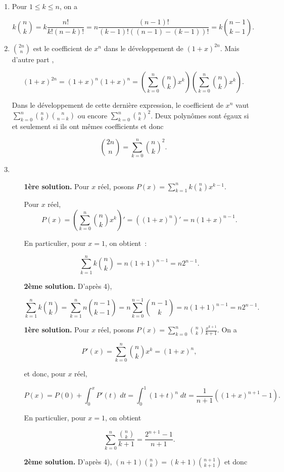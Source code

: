 \documentclass[11pt,a4paper]{article}
\begin{document}
\begin{enumerate}
\item  Pour $1\leq k\leq n$, on a

$$k\binom{n}{k}=k\frac{n!}{k!(n-k)!}=n\frac{(n-1)!}{(k-1)!((n-1)-(k-1))!}=k\binom{n-1}{k-1}.$$

\item  $\binom{2n}{n}$ est le coefficient de $x^n$ dans le développement de $(1+x)^{2n}$. Mais d'autre part ,

$$(1+x)^{2n}=(1+x)^n(1+x)^n=(\sum_{k=0}^{n}\binom{n}{k}x^k)(\sum_{k=0}^{n}\binom{n}{k}x^k).$$

Dans le développement de cette dernière expression, le coefficient de $x^n$ vaut $\sum_{k=0}^{n}\binom{n}{k}\binom{n}{n-k}$ ou
encore $\sum_{k=0}^{n}\binom{n}{k}^2$. Deux polynômes sont égaux si et seulement si ils ont mêmes
coefficients et donc

$$\binom{2n}{n}=\sum_{k=0}^{n}\binom{n}{k}^2.$$

\item 
\begin{itemize}
\item[\textbf{1ère solution.}] Pour $x$ réel, posons $P(x)=\sum_{k=1}^{n}k\binom{n}{k}x^{k-1}$.

Pour $x$ réel, $$P(x)=(\sum_{k=0}^{n}\binom{n}{k}x^{k})'=((1+x)^n)'=n(1+x)^{n-1}.$$

En particulier, pour $x=1$, on obtient~:

$$\sum_{k=1}^{n}k\binom{n}{k}=n(1+1)^{n-1}=n2^{n-1}.$$

\item[\textbf{2ème solution.}] D'après 4),

$$\sum_{k=1}^{n}k\binom{n}{k}=\sum_{k=1}^{n}n\binom{n-1}{k-1}=n\sum_{k=0}^{n-1}\binom{n-1}{k}=n(1+1)^{n-1}=n2^{n-1}.$$
\end{itemize}

\begin{itemize}
\item[\textbf{1ère solution.}] Pour $x$ réel, posons $P(x)=\sum_{k=0}^{n}\binom{n}{k}\frac{x^{k+1}}{k+1}$. On a

$$P'(x)=\sum_{k=0}^{n}\binom{n}{k}x^k=(1+x)^n,$$

et donc, pour $x$ réel,

$$P(x)=P(0)+\int_{0}^{x}P'(t)\;dt=\int_{0}^{1}(1+t)^n\;dt=\frac{1}{n+1}((1+x)^{n+1}-1).$$

En particulier, pour $x=1$, on obtient

$$\sum_{k=0}^{n}\frac{\binom{n}{k}}{k+1}=\frac{2^{n+1}-1}{n+1}.$$

\item[\textbf{2ème solution.}] D'après 4), $(n+1)\binom{n}{k}=(k+1)\binom{n+1}{k+1}$ et donc


\end{itemize}
\end{enumerate}
\end{document}
